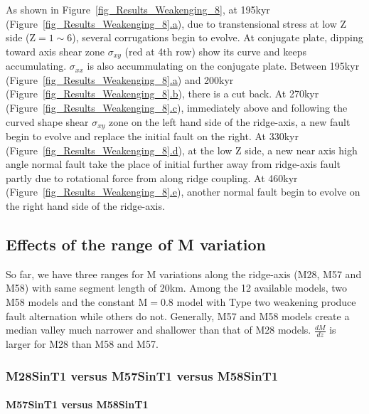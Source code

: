 As shown in Figure~\hyperref[fig_Results_Weakenging_8]{\ref{fig_Results_Weakenging_8}}, at 195kyr (Figure~\hyperref[fig_Results_Weakenging_8]{\ref{fig_Results_Weakenging_8}.a}), due to transtensional stress at low Z side (Z$=1\sim6$), several corrugations begin to evolve. At conjugate plate, dipping toward axis shear zone $\sigma_{xy}$ (red at 4th row) show its curve and keeps accumulating. $\sigma_{xx}$ is also accummulating on the conjugate plate. Between 195kyr (Figure~\hyperref[fig_Results_Weakenging_8]{\ref{fig_Results_Weakenging_8}.a}) and 200kyr (Figure~\hyperref[fig_Results_Weakenging_8]{\ref{fig_Results_Weakenging_8}.b}), there is a cut back. At 270kyr (Figure~\hyperref[fig_Results_Weakenging_8]{\ref{fig_Results_Weakenging_8}.c}), immediately above and following the curved shape shear $\sigma_{xy}$ zone on the left hand side of the ridge-axis, a new fault begin to evolve and replace the initial fault on the right. At 330kyr (Figure~\hyperref[fig_Results_Weakenging_8]{\ref{fig_Results_Weakenging_8}.d}), at the low Z side, a new near axis high angle normal fault take the place of initial further away from ridge-axis fault partly due to rotational force from along ridge coupling. At 460kyr (Figure~\hyperref[fig_Results_Weakenging_8]{\ref{fig_Results_Weakenging_8}.e}), another normal fault begin to evolve on the right hand side of the ridge-axis.

\subsection{Effects of the range of M variation}
So far, we have three ranges for M variations along the ridge-axis (M28, M57 and M58) with same segment length of 20km. Among the 12 available models, two M58 models and the constant M$=0.8$ model with Type two weakening produce fault alternation while others do not. Generally, M57 and M58 models create a median valley much narrower and shallower than that of M28 models. $\frac{dM}{dz}$ is larger for M28 than M58 and M57.

\subsubsection{M28SinT1 versus M57SinT1 versus M58SinT1}

\paragraph{M57SinT1 versus M58SinT1}\label{M57SinT1 versus M58SinT1}

